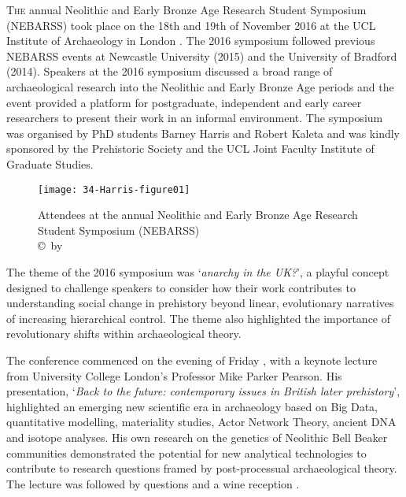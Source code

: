\IJSRAopening
\lettrine{T}{he}  annual Neolithic and Early Bronze Age Research Student Symposium (NEBARSS) took place on the 18th and 19th of November 2016 at the UCL Institute of Archaeology in London . The 2016 symposium followed previous NEBARSS events at Newcastle University (2015) and the University of Bradford (2014). Speakers at the 2016 symposium discussed a broad range of archaeological research into the Neolithic and Early Bronze Age periods and the event provided a platform for postgraduate, independent and early career researchers to present their work in an informal environment. The symposium was organised by PhD students Barney Harris and Robert Kaleta and was kindly sponsored by the Prehistoric Society and the UCL Joint Faculty Institute of Graduate Studies.


\begin{figure}[!htb]
	\texttt{[image: 34-Harris-figure01]}
	\caption{Attendees at the  annual Neolithic and Early Bronze Age Research Student Symposium (NEBARSS)
		{\normalfont\scriptsize \\ \copyright\ by \shortauthor
	}}
	\label{fig:34-Harris-figure01}
\end{figure}

The theme of the 2016 symposium was ‘\textit{anarchy in the UK?}’, a playful concept designed to challenge speakers to consider how their work contributes to understanding social change in prehistory beyond linear, evolutionary narratives of increasing hierarchical control. The theme also highlighted the importance of revolutionary shifts within archaeological theory. 

The conference commenced on the evening of Friday , with a keynote lecture from University College London’s Professor Mike Parker Pearson. His presentation, ‘\textit{Back to the future: contemporary issues in British later prehistory}’, 
highlighted an emerging new scientific era in archaeology based on Big Data, quantitative modelling, materiality studies, Actor Network Theory, ancient DNA and isotope analyses. His own research on the genetics of Neolithic Bell Beaker communities demonstrated the potential for new analytical technologies to contribute to research questions framed by post-processual archaeological theory. The lecture was followed by questions and a wine reception . 

